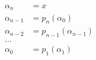 \documentclass[preview]{standalone}
\begin{document}
\begin{align*}
\alpha _n &= x\\ \alpha _{n-1} &= p_n( \alpha _0)\\ \alpha _{n-2} &= p_{n-1}( \alpha _{n-1})\\\ldots\\ \alpha _0 &= p_1( \alpha _1)
\end{align*}
\end{document}
